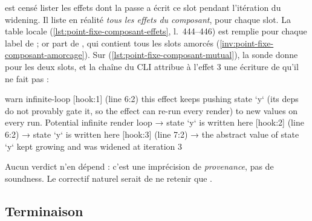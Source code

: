 \begin{piege}
 est censé lister \og les effets dont la passe a écrit ce slot
pendant l'itération du widening\fg. Il liste en réalité \emph{tous les
effets du composant}, pour chaque slot. La table locale 
(\cref{lst:point-fixe-composant-effets}, l.~444--446) est remplie pour chaque
label de  ; or  part de
, qui contient tous les slots amorcés
(\cref{inv:point-fixe-composant-amorcage}). Sur 
(\cref{lst:point-fixe-composant-mutual}), la sonde donne
 pour les deux slots, et la chaîne  du
CLI attribue à l'effet 3 une écriture de  qu'il ne fait pas :
\begin{sortie}
    warn   infinite-loop  [hook:1]  (line 6:2)  this effect keeps pushing state `y` (its deps do not provably gate it, so the effect can re-run every render) to new values on every run. Potential infinite render loop
       → state `y` is written here [hook:2] (line 6:2)
       → state `y` is written here [hook:3] (line 7:2)
       → the abstract value of state `y` kept growing and was widened at iteration 3
\end{sortie}
Aucun verdict n'en dépend : c'est une imprécision de \emph{provenance}, pas
de soundness. Le correctif naturel serait de ne retenir que
.
\end{piege}

\subsection{Terminaison}
\label{sec:point-fixe-composant-terminaison}

